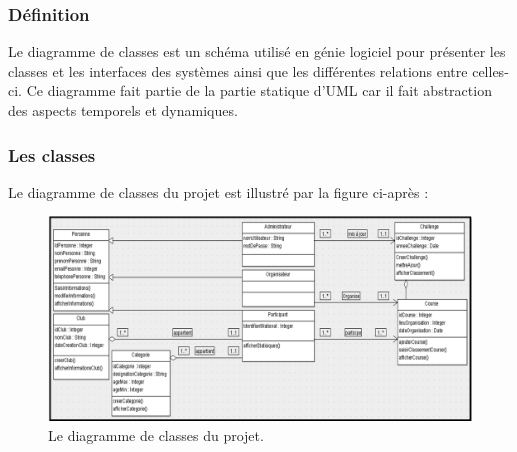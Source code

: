 \subsubsection{Définition}
Le diagramme de classes est un schéma utilisé en génie logiciel pour présenter les classes et les interfaces des systèmes ainsi que les différentes relations entre celles-ci. Ce diagramme fait partie de la partie statique d'UML car il fait abstraction des aspects temporels et dynamiques.

\subsubsection{Les classes}
Le diagramme de classes du projet est illustré par la figure ci-après :
\newpage
\begin{figure}
	   \center
	   \includegraphics[scale=0.8]{img/Diagramme_classes.png}
	   \caption {Le diagramme de classes du projet.}
\end{figure}

